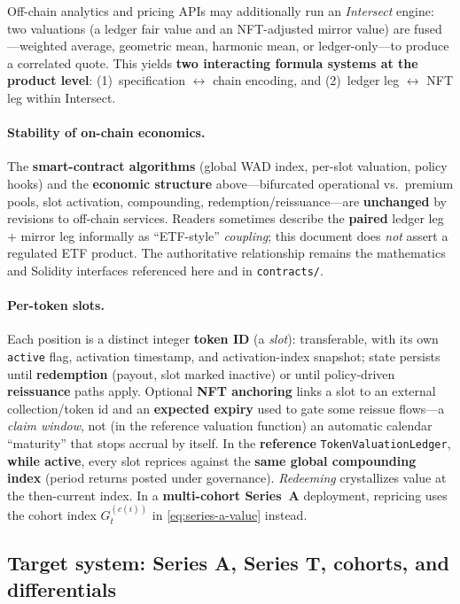 \documentclass[11pt,a4paper]{article}
\begin{document}
Off-chain analytics and pricing APIs may additionally run an \emph{Intersect} engine: two valuations
(a ledger fair value and an NFT-adjusted mirror value) are fused---weighted average, geometric mean,
harmonic mean, or ledger-only---to produce a correlated quote. This yields \textbf{two interacting
formula systems at the product level}: (1)~specification $\leftrightarrow$ chain encoding, and
(2)~ledger leg $\leftrightarrow$ NFT leg within Intersect.

\paragraph{Stability of on-chain economics.}
The \textbf{smart-contract algorithms} (global WAD index, per-slot valuation, policy hooks) and the
\textbf{economic structure} above---bifurcated operational vs.\ premium pools, slot activation, compounding, redemption/reissuance---are \textbf{unchanged} by revisions to off-chain services. Readers sometimes describe the \textbf{paired} ledger leg + mirror leg informally as ``ETF-style'' \emph{coupling}; this document does \emph{not} assert a regulated ETF product. The authoritative relationship remains the mathematics and Solidity interfaces referenced here and in \texttt{contracts/}.

\paragraph{Per-token slots.}
Each position is a distinct integer \textbf{token ID} (a \emph{slot}): transferable, with its own \texttt{active} flag, activation timestamp, and activation-index snapshot; state persists until \textbf{redemption} (payout, slot marked inactive) or until policy-driven \textbf{reissuance} paths apply. Optional \textbf{NFT anchoring} links a slot to an external collection/token id and an \textbf{expected expiry} used to gate some reissue flows---a \emph{claim window}, not (in the reference valuation function) an automatic calendar ``maturity'' that stops accrual by itself. In the \textbf{reference} \texttt{TokenValuationLedger}, \textbf{while active}, every slot reprices against the \textbf{same global compounding index} (period returns posted under governance). \emph{Redeeming} crystallizes value at the then-current index. In a \textbf{multi-cohort Series~A} deployment, repricing uses the cohort index $G^{(c(i))}_t$ in \eqref{eq:series-a-value} instead.

\subsection*{Target system: Series \textbf{A}, Series \textbf{T}, cohorts, and differentials}
\end{document}

